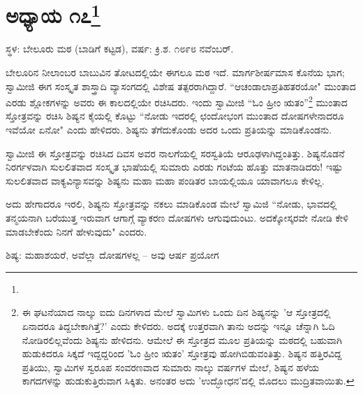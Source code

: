 \newpage

\chapter[ಅಧ್ಯಾಯ ೧೭]{ಅಧ್ಯಾಯ ೧೭\protect\footnote{}}

\centerline{ಸ್ಥಳ: ಬೇಲೂರು ಮಠ (ಬಾಡಿಗೆ ಕಟ್ಟಡ), ವರ್ಷ: ಕ್ರಿ.ಶ. ೧೮೯೮ ನವೆಂಬರ್.}

ಬೇಲೂರಿನ ನೀಲಾಂಬರ ಬಾಬುವಿನ ತೋಟದಲ್ಲಿಯೇ ಈಗಲೂ ಮಠ ಇದೆ. ಮಾರ್ಗಶೀರ್ಷಮಾಸ ಕೊನೆಯ ಭಾಗ; ಸ್ವಾಮೀಜಿ ಈಗ ಸಂಸ್ಕೃತ ಶಾಸ್ತ್ರಾದಿ ವ್ಯಾಸಂಗದಲ್ಲಿ ವಿಶೇಷ ತತ್ಪರರಾಗಿದ್ದಾರೆ. “ಆಚಂಡಾಲಾಪ್ರತಿಹತರಯೋ" ಮುಂತಾದ ಎರಡು ಶ್ಲೋಕಗಳನ್ನು ಅವರು ಈ ಕಾಲದಲ್ಲಿಯೇ ರಚಿಸಿದರು. ಇಂದು ಸ್ವಾಮೀಜಿ “ಓಂ ಹ್ರೀಂ ಋತಂ”\footnote{ಈ ಘಟನೆಯಾದ ನಾಲ್ಕು ಐದು ದಿನಗಳಾದ ಮೇಲೆ ಸ್ವಾಮಿಗಳು ಒಂದು ದಿನ ಶಿಷ್ಯನನ್ನು 'ಆ ಸ್ತೋತ್ರದಲ್ಲಿ ಏನಾದರೂ ತಿದ್ದಬೇಕಾಗಿತ್ತೆ?' ಎಂದು ಕೇಳಿದರು. ಅದಕ್ಕೆ ಉತ್ತರವಾಗಿ ತಾನು ಅದನ್ನು ಇನ್ನೂ ಚೆನ್ನಾಗಿ ಓದಿ ನೋಡಿರಲಿಲ್ಲವೆಂದು ಶಿಷ್ಯನು ಹೇಳಿದನು. ಆಮೇಲೆ ಈ ಸ್ತೋತ್ರದ ಮೂಲ ಪ್ರತಿಯನ್ನು ಮಠದಲ್ಲಿ ಬಹುವಾಗಿ ಹುಡುಕಿದರೂ ಸಿಕ್ಕದೆ ಇದ್ದದ್ದರಿಂದ 'ಓಂ ಹ್ರೀಂ ಋತಂ' ಸ್ತೋತ್ರವು ಹೋಗಿಬಿಡುವಂತಿತ್ತು. ಶಿಷ್ಯನ ಹತ್ತಿರವಿದ್ದ ಪ್ರತಿಯು, ಸ್ವಾಮಿಗಳ ಸ್ವರೂಪ ಸಂವರಣವಾದ ಸುಮಾರು ನಾಲ್ಕು ವರ್ಷಗಳ ಮೇಲೆ, ಶಿಷ್ಯನ ಹಳೆಯ ಕಾಗದಗಳನ್ನು ಹುಡುಕುತ್ತಿರುವಾಗ ಸಿಕ್ಕಿತು. ಅನಂತರ ಅದು 'ಉದ್ಭೋಧನ'ದಲ್ಲಿ ಮೊದಲು ಮುದ್ರಿತವಾಯಿತು.} ಮುಂತಾದ ಸ್ತೋತ್ರವನ್ನು ರಚಿಸಿ ಶಿಷ್ಯನ ಕೈಯಲ್ಲಿ ಕೊಟ್ಟು “ನೋಡು ಇದರಲ್ಲಿ ಛಂದೋಭಂಗ ಮುಂತಾದ ದೋಷಗಳೇನಾದರೂ ಇವೆಯೋ ಏನೋ" ಎಂದು ಹೇಳಿದರು. ಶಿಷ್ಯನು ತೆಗೆದುಕೊಂಡು ಅದರ ಒಂದು ಪ್ರತಿಯನ್ನು ಮಾಡಿಕೊಂಡನು.

ಸ್ವಾಮೀಜಿ ಈ ಸ್ತೋತ್ರವನ್ನು ರಚಿಸಿದ ದಿವಸ ಅವರ ನಾಲಗೆಯಲ್ಲಿ ಸರಸ್ವತಿಯೆ ಆರೂಢಳಾಗಿದ್ದಂತಿತ್ತು. ಶಿಷ್ಯನೊಡನೆ ನಿರರ್ಗಳವಾಗಿ ಸುಲಲಿತವಾದ ಸಂಸ್ಕೃತ ಭಾಷೆಯಲ್ಲಿ ಸುಮಾರು ಎರಡು ಗಂಟೆಯ ಹೊತ್ತು ಮಾತನಾಡಿದರು! ಇಷ್ಟು ಸುಲಲಿತವಾದ ವಾಕ್ಯವಿನ್ಯಾಸವನ್ನು ಶಿಷ್ಯನು ಮಹಾ ಮಹಾ ಪಂಡಿತರ ಬಾಯಲ್ಲಿಯೂ ಯಾವಾಗಲೂ ಕೇಳಿಲ್ಲ.

ಅದು ಹೇಗಾದರೂ ಇರಲಿ, ಶಿಷ್ಯನು ಸ್ತೋತ್ರವನ್ನು ನಕಲು ಮಾಡಿಕೊಂಡ ಮೇಲೆ ಸ್ವಾಮಿಜಿ “ನೋಡು, ಭಾವದಲ್ಲಿ ತನ್ಮಯನಾಗಿ ಬರೆಯುತ್ತ ಇರುವಾಗ ಆಗಾಗ್ಗೆ ವ್ಯಾಕರಣ ದೋಷಗಳು ಆಗುವುದುಂಟು. ಅದಕ್ಕೋಸ್ಕರವೇ ನೋಡಿ ಕೇಳಿ ಮಾಡಬೇಕೆಂದು ನಿನಗೆ ಹೇಳುವುದು" ಎಂದರು.

ಶಿಷ್ಯ: ಮಹಾಶಯರೆ, ಅವೆಲ್ಲಾ ದೋಷಗಳಲ್ಲ – ಅವು ಆರ್ಷ ಪ್ರಯೋಗ


